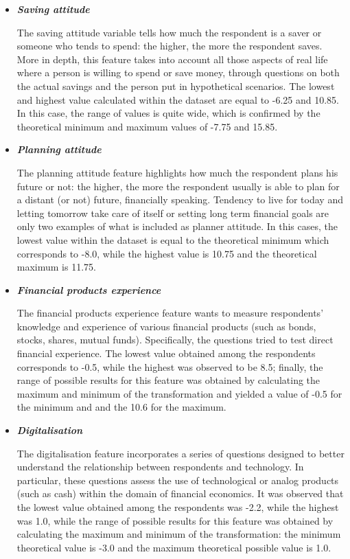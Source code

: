\documentclass[a4paper,11pt]{article}
\begin{document}
\begin{itemize}
\item{\textit{\textbf{Saving attitude}}}

The saving attitude variable tells how much the respondent is a saver or someone who tends to spend: the higher, the more the respondent saves. More in depth, this feature takes into account all those aspects of real life where a person is willing to spend or save money, through questions on both the actual savings and the person put in hypothetical scenarios. The lowest and highest value calculated within the dataset are equal to -6.25 and 10.85. In this case, the range of values is quite wide, which is confirmed by the theoretical minimum and maximum values of -7.75 and 15.85.

\item{\textit{\textbf{Planning attitude}}}

The planning attitude feature highlights how much the respondent plans his future or not: the higher, the more the respondent usually is able to plan for a distant (or not) future, financially speaking. Tendency to live for today and letting tomorrow take care of itself or setting long term financial goals are only two examples of what is included as planner attitude. In this cases, the lowest value within the dataset is equal to the theoretical minimum which corresponds to -8.0, while the highest value is 10.75 and the theoretical maximum is 11.75.

\item{\textit{\textbf{Financial products experience}}}

The financial products experience feature wants to measure respondents' knowledge and experience of various financial products (such as bonds, stocks, shares, mutual funds). Specifically, the questions tried to test direct financial experience.
The lowest value obtained among the respondents corresponds to -0.5, while the highest was observed to be 8.5; finally, the range of possible results for this feature was obtained by calculating the maximum and minimum of the transformation and yielded a value of -0.5 for the minimum and and the 10.6 for the maximum.

\item{\textit{\textbf{Digitalisation}}}

The digitalisation feature incorporates a series of questions designed to better understand the relationship between respondents and technology.
In particular, these questions assess the use of technological or analog products (such as cash) within the domain of financial economics.
It was observed that the lowest value obtained among the respondents was -2.2, while the highest was 1.0, while the range of possible results for this feature was obtained by calculating the maximum and minimum of the transformation: the minimum theoretical value is -3.0 and the maximum theoretical possible value is 1.0.


\end{itemize}
\end{document}
